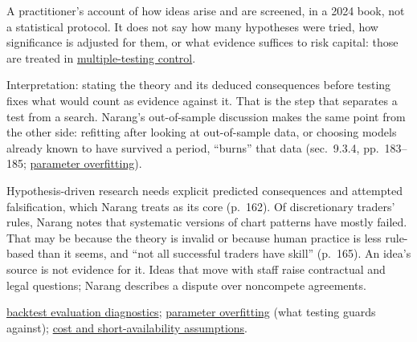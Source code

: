 \begin{qfmethod}
 A practitioner's account of how ideas arise and are screened, in a 2024 book, not a statistical protocol. It does not say how many hypotheses were tried, how significance is adjusted for them, or what evidence suffices to risk capital: those are treated in \hyperref[meth:multiple-testing-control]{multiple-testing control}.

 Interpretation: stating the theory and its deduced consequences before testing fixes what would count as evidence against it. That is the step that separates a test from a search. Narang's out-of-sample discussion makes the same point from the other side: refitting after looking at out-of-sample data, or choosing models already known to have survived a period, ``burns'' that data (sec.~9.3.4, pp.~183--185; \hyperref[pit:parameter-overfitting]{parameter overfitting}).

 Hypothesis-driven research needs explicit predicted consequences and attempted falsification, which Narang treats as its core (p.~162). Of discretionary traders' rules, Narang notes that systematic versions of chart patterns have mostly failed. That may be because the theory is invalid or because human practice is less rule-based than it seems, and ``not all successful traders have skill'' (p.~165). An idea's source is not evidence for it. Ideas that move with staff raise contractual and legal questions; Narang describes a dispute over noncompete agreements.

 \hyperref[meth:backtest-evaluation-diagnostics]{backtest evaluation diagnostics}; \hyperref[pit:parameter-overfitting]{parameter overfitting} (what testing guards against); \hyperref[pit:backtest-cost-short-assumptions]{cost and short-availability assumptions}.

\end{qfmethod}

